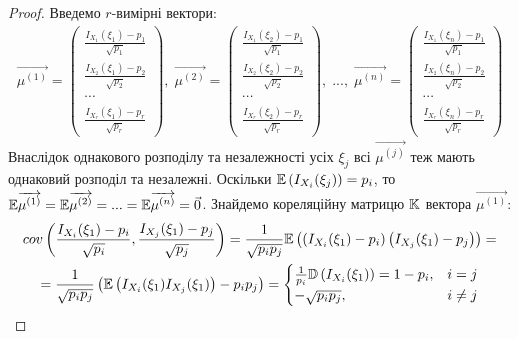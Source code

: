 \begin{proof}
    Введемо $r$-вимірні вектори:
    \begin{gather*}
        \overrightarrow{\mu^{(1)}} = \begin{pmatrix}
            \frac{I_{X_1}(\xi_1) - p_1}{\sqrt{p_1}} \\
            \frac{I_{X_2}(\xi_1) - p_2}{\sqrt{p_2}} \\
            \cdots \\
            \frac{I_{X_r}(\xi_1) - p_r}{\sqrt{p_r}}
        \end{pmatrix}, \;
        \overrightarrow{\mu^{(2)}} = \begin{pmatrix}
            \frac{I_{X_1}(\xi_2) - p_1}{\sqrt{p_1}} \\
            \frac{I_{X_2}(\xi_2) - p_2}{\sqrt{p_2}} \\
            \cdots \\
            \frac{I_{X_r}(\xi_2) - p_r}{\sqrt{p_r}}
        \end{pmatrix}, \;
        ..., \;
        \overrightarrow{\mu^{(n)}} = \begin{pmatrix}
            \frac{I_{X_1}(\xi_n) - p_1}{\sqrt{p_1}} \\
            \frac{I_{X_2}(\xi_n) - p_2}{\sqrt{p_2}} \\
            \cdots \\
            \frac{I_{X_r}(\xi_n) - p_r}{\sqrt{p_r}}
        \end{pmatrix}
    \end{gather*}
    Внаслідок однакового розподілу та незалежності усіх $\xi_j$ всі $\overrightarrow{\mu^{(j)}}$ теж мають однаковий розподіл та незалежні.
    Оскільки $\mathbb{E}\left(I_{X_i}(\xi_j)\right) = p_i$, то $\mathbb{E} \overrightarrow{\mu^{(1)}} = \mathbb{E} \overrightarrow{\mu^{(2)}} = ... = \mathbb{E} \overrightarrow{\mu^{(n)}} = \vec{0}$.
    Знайдемо кореляційну матрицю $\mathbb{K}$ вектора $\overrightarrow{\mu^{(1)}}$:
    \begin{gather*}
        {cov}\left(\frac{I_{X_i}(\xi_1) - p_i}{\sqrt{p_i}}, \frac{I_{X_j}(\xi_1) - p_j}{\sqrt{p_j}}\right) = 
        \frac{1}{\sqrt{p_i p_j}} \E\left(\left(I_{X_i}(\xi_1) - p_i\right)\left(I_{X_j}(\xi_1) - p_j\right)\right) = \\
        = \frac{1}{\sqrt{p_i p_j}} \left(\E\left(I_{X_i}(\xi_1) I_{X_j}(\xi_1)\right) - p_i p_j\right) = 
        \begin{cases}
            \frac{1}{p_i} \D\left(I_{X_i}(\xi_1)\right) = 1 - p_i, & i = j \\
            -\sqrt{p_i p_j}, & i\neq j
        \end{cases}

\end{gather*}
\end{proof}
